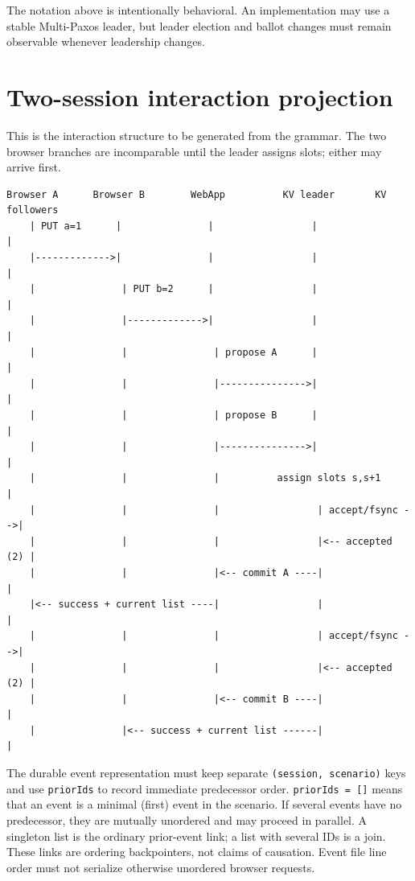 The notation above is intentionally behavioral. An implementation may
use a stable Multi-Paxos leader, but leader election and ballot changes
must remain observable whenever leadership changes.

\hypertarget{two-session-interaction-projection}{%
\section{Two-session interaction
projection}\label{two-session-interaction-projection}}

This is the interaction structure to be generated from the grammar. The
two browser branches are incomparable until the leader assigns slots;
either may arrive first.

\begin{verbatim}
Browser A      Browser B        WebApp          KV leader       KV followers
    | PUT a=1      |               |                 |                 |
    |------------->|               |                 |                 |
    |               | PUT b=2      |                 |                 |
    |               |------------->|                 |                 |
    |               |               | propose A      |                 |
    |               |               |--------------->|                 |
    |               |               | propose B      |                 |
    |               |               |--------------->|                 |
    |               |               |          assign slots s,s+1      |
    |               |               |                 | accept/fsync -->|
    |               |               |                 |<-- accepted (2) |
    |               |               |<-- commit A ----|                 |
    |<-- success + current list ----|                 |                 |
    |               |               |                 | accept/fsync -->|
    |               |               |                 |<-- accepted (2) |
    |               |               |<-- commit B ----|                 |
    |               |<-- success + current list ------|                 |
\end{verbatim}

The durable event representation must keep separate
\texttt{(session,\ scenario)} keys and use \texttt{priorIds} to record
immediate predecessor order. \texttt{priorIds\ =\ {[}{]}} means that an
event is a minimal (first) event in the scenario. If several events have
no predecessor, they are mutually unordered and may proceed in parallel.
A singleton list is the ordinary prior-event link; a list with several
IDs is a join. These links are ordering backpointers, not claims of
causation. Event file line order must not serialize otherwise unordered
browser requests.

